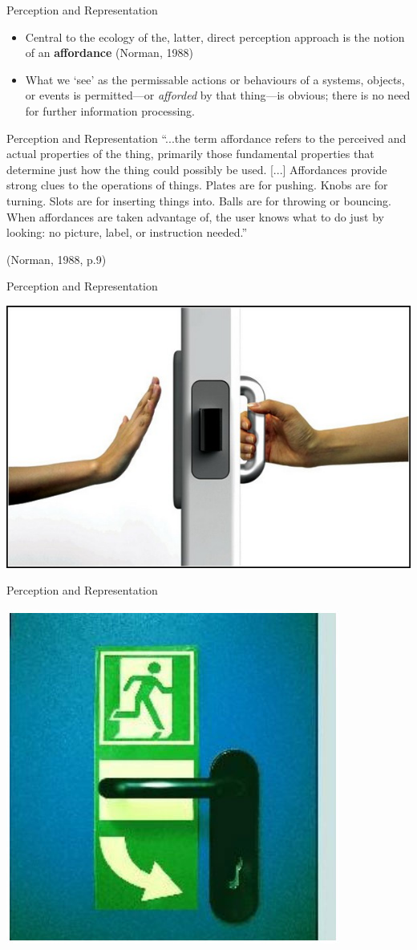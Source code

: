 \begin{frame}{Perception and Representation}
	\begin{itemize}
		\item Central to the ecology of the, latter, direct perception approach is the notion of an \textbf{affordance} (Norman, 1988)
		\item What we `see' as the permissable actions or behaviours of a systems, objects, or events is permitted---or \textit{afforded} by that thing---is obvious;
		there is no need for further information processing.
	\end{itemize}
\end{frame}

\begin{frame}{Perception and Representation}
	``...the term affordance refers to the perceived and actual properties of the thing, primarily those fundamental properties that determine just how the thing 
	could possibly be used. [...] Affordances provide strong clues to the operations of things. Plates are for pushing. Knobs are for turning. Slots are for inserting 
	things into. Balls are for throwing or bouncing. When affordances are taken advantage of, the user knows what to do just by looking: no picture, label, or instruction 
	needed.''
	
	\vspace{2ex}
	
	(Norman, 1988, p.9)
\end{frame}

\begin{frame}{Perception and Representation}
	\begin{centering}
		\includegraphics[height=26ex]{door_affordance.jpg}
	\end{centering}
\end{frame}

\begin{frame}{Perception and Representation}
	\begin{centering}
		\includegraphics[height=26ex]{guidance_required.jpg}
	\end{centering}
\end{frame}


